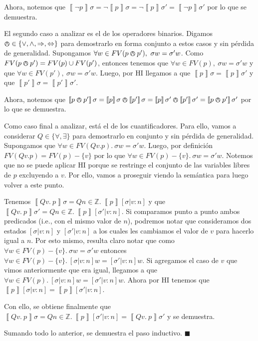 \documentclass{article}
\newcommand{\sem}[1]{\left\llbracket #1\right\rrbracket}
\newcommand{\Z}{\mathbb{Z}}
\begin{document}
\begin{itemize}
	      Ahora, notemos que $\sem{\neg p} \sigma = \neg \sem{p} \sigma = \neg \sem{p} \sigma' = \sem{\neg p} \sigma'$ por lo que se demuestra.

	      El segundo caso a analizar es el de los operadores binarios.
	      Digamos $\varowedge \in \{ \lor , \land , \Rightarrow , \Leftrightarrow \}$ para demostrarlo en forma conjunto a estos casos y sin pérdida de generalidad.
	      Supongamos $\forall w \in FV(p \varowedge p'),\ \sigma w = \sigma' w$.
	      Como $FV(p \varowedge p') = FV(p) \cup FV(p')$, entonces tenemos que $\forall w \in FV(p),\ \sigma w = \sigma' w$ y que $\forall w \in FV(p'),\ \sigma w = \sigma' w$.
	      Luego, por HI llegamos a que $\sem{p} \sigma = \sem{p} \sigma'$ y que $\sem{p'} \sigma = \sem{p'} \sigma'$.

	      Ahora, notemos que $\sem{p \varowedge p'} \sigma = \sem{p} \sigma \varowedge \sem{p'} \sigma = \sem{p} \sigma' \varowedge \sem{p'} \sigma' = \sem{p \varowedge p'} \sigma'$ por lo que se demuestra.

	      Como caso final a analizar, está el de los cuantificadores.
	      Para ello, vamos a considerar $Q \in \{ \forall , \exists \}$ para demostrarlo en conjunto y sin pérdida de generalidad.
	      Supongamos que $\forall w \in FV(Q v. p).\ \sigma w = \sigma' w$.
	      Luego, por definición $FV(Q v. p) = FV(p) - \{v\}$ por lo que $\forall w \in FV(p) - \{v\}.\ \sigma w = \sigma' w$.
	      Notemos que no se puede aplicar HI porque se restringe el conjunto de las variables libres de $p$ excluyendo a $v$.
	      Por ello, vamos a proseguir viendo la semántica para luego volver a este punto.

	      Tenemos $\sem{Q v.\ p} \sigma = Q n \in \Z.\ \sem{p} [\sigma | v : n]$ y que $\sem{Q v.\ p} \sigma' = Q n \in \Z.\ \sem{p} [\sigma' | v : n]$.
	      Si comparamos punto a punto ambos predicados (i.e., con el mismo valor de $n$), podremos notar que consideramos dos estados $[\sigma | v : n]$ y $[\sigma' | v : n]$ a los cuales les cambiamos el valor de $v$ para hacerlo igual a $n$.
	      Por esto mismo, resulta claro notar que como $\forall w \in FV(p) - \{v\}.\ \sigma w = \sigma' w$ entonces $\forall w \in FV(p) - \{v\}.\ [\sigma | v : n] w = [\sigma' | v : n] w$.
	      Si agregamos el caso de $v$ que vimos anteriormente que era igual, llegamos a que $\forall w \in FV(p).\ [\sigma | v : n] w = [\sigma' | v : n] w$.
	      Ahora por HI tenemos que $\sem{p} [\sigma | v : n] = \sem{p} [\sigma' | v : n]$.

	      Con ello, se obtiene finalmente que $\sem{Q v.\ p} \sigma = Q n \in \Z.\ \sem{p} [\sigma' | v : n] = \sem{Q v.\ p} \sigma'$ y se demuestra.

	      Sumando todo lo anterior, se demuestra el paso inductivo. $\blacksquare$
\end{itemize}
\end{document}
